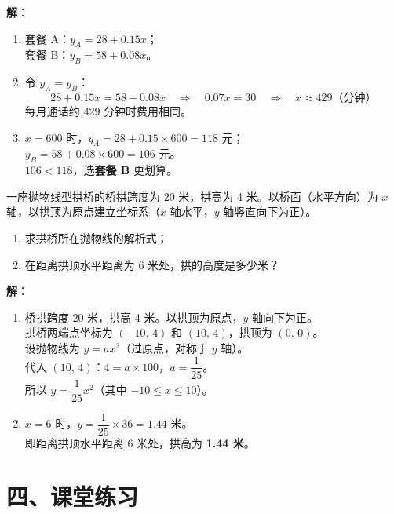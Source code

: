 \documentclass[12pt, a4paper]{ctexart}
\begin{document}
\textbf{解}：
\begin{enumerate}[label=(\arabic*)]
  \item 套餐 A：$y_A = 28 + 0.15x$；\\
        套餐 B：$y_B = 58 + 0.08x$。
  \item 令 $y_A = y_B$：
        \[
          28 + 0.15x = 58 + 0.08x \quad\Rightarrow\quad 0.07x = 30 \quad\Rightarrow\quad x \approx 429 \text{（分钟）}
        \]
        每月通话约 429 分钟时费用相同。
  \item $x = 600$ 时，$y_A = 28 + 0.15 \times 600 = 118$ 元；\\
        $y_B = 58 + 0.08 \times 600 = 106$ 元。\\
        $106 < 118$，选\textbf{套餐 B} 更划算。
\end{enumerate}

\begin{appbox}[【应用3】抛物线型拱桥]
一座抛物线型拱桥的桥拱跨度为 20 米，拱高为 4 米。以桥面（水平方向）为 $x$ 轴，以拱顶为原点建立坐标系（$x$ 轴水平，$y$ 轴竖直向下为正）。
\begin{enumerate}[label=(\arabic*)]
  \item 求拱桥所在抛物线的解析式；
  \item 在距离拱顶水平距离为 6 米处，拱的高度是多少米？
\end{enumerate}
\end{appbox}

\textbf{解}：
\begin{enumerate}[label=(\arabic*)]
  \item 桥拱跨度 20 米，拱高 4 米。以拱顶为原点，$y$ 轴向下为正。\\
        拱桥两端点坐标为 $(-10,\,4)$ 和 $(10,\,4)$，拱顶为 $(0,\,0)$。\\
        设抛物线为 $y = ax^2$（过原点，对称于 $y$ 轴）。\\
        代入 $(10,\,4)$：$4 = a \times 100$，$a = \dfrac{1}{25}$。\\
        所以 $y = \dfrac{1}{25}x^2$（其中 $-10 \leqslant x \leqslant 10$）。
  \item $x = 6$ 时，$y = \dfrac{1}{25} \times 36 = 1.44$ 米。\\
        即距离拱顶水平距离 6 米处，拱高为 \textbf{1.44 米}。
\end{enumerate}

\section*{\textcolor{tipgreen}{四、课堂练习}}
\end{document}
